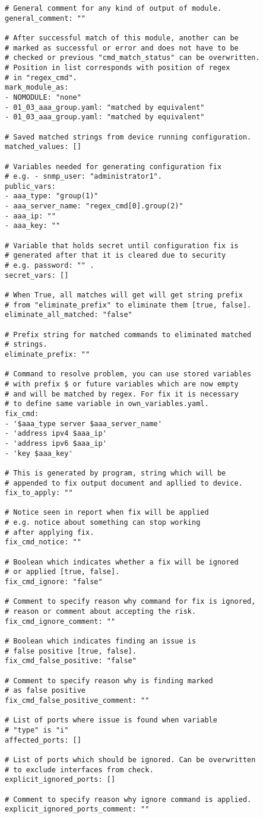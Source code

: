 \begin{lstlisting}
# General comment for any kind of output of module.
general_comment: ""

# After successful match of this module, another can be 
# marked as successful or error and does not have to be 
# checked or previous "cmd_match_status" can be overwritten.
# Position in list corresponds with position of regex 
# in "regex_cmd".
mark_module_as:
- NOMODULE: "none"
- 01_03_aaa_group.yaml: "matched by equivalent"
- 01_03_aaa_group.yaml: "matched by equivalent"

# Saved matched strings from device running configuration.
matched_values: []

# Variables needed for generating configuration fix
# e.g. - snmp_user: "administrator1".
public_vars:
- aaa_type: "group(1)"
- aaa_server_name: "regex_cmd[0].group(2)"
- aaa_ip: ""
- aaa_key: ""

# Variable that holds secret until configuration fix is 
# generated after that it is cleared due to security 
# e.g. password: "" .
secret_vars: []

# When True, all matches will get will get string prefix 
# from "eliminate_prefix" to eliminate them [true, false].
eliminate_all_matched: "false"

# Prefix string for matched commands to eliminated matched 
# strings.
eliminate_prefix: ""

# Command to resolve problem, you can use stored variables
# with prefix $ or future variables which are now empty 
# and will be matched by regex. For fix it is necessary 
# to define same variable in own_variables.yaml.
fix_cmd: 
- '$aaa_type server $aaa_server_name'
- 'address ipv4 $aaa_ip'
- 'address ipv6 $aaa_ip'
- 'key $aaa_key'

# This is generated by program, string which will be 
# appended to fix output document and apllied to device.
fix_to_apply: "" 

# Notice seen in report when fix will be applied 
# e.g. notice about something can stop working 
# after applying fix.
fix_cmd_notice: ""

# Boolean which indicates whether a fix will be ignored 
# or applied [true, false].
fix_cmd_ignore: "false"

# Comment to specify reason why command for fix is ignored,
# reason or comment about accepting the risk.
fix_cmd_ignore_comment: ""

# Boolean which indicates finding an issue is 
# false positive [true, false].
fix_cmd_false_positive: "false"

# Comment to specify reason why is finding marked 
# as false positive
fix_cmd_false_positive_comment: "" 

# List of ports where issue is found when variable 
# "type" is "i"
affected_ports: []

# List of ports which should be ignored. Can be overwritten 
# to exclude interfaces from check.
explicit_ignored_ports: []

# Comment to specify reason why ignore command is applied.
explicit_ignored_ports_comment: "" 
\end{lstlisting}
